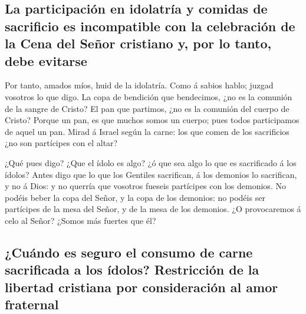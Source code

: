 \hypertarget{la-participaciuxf3n-en-idolatruxeda-y-comidas-de-sacrificio-es-incompatible-con-la-celebraciuxf3n-de-la-cena-del-seuxf1or-cristiano-y-por-lo-tanto-debe-evitarse}{%
\subsection{La participación en idolatría y comidas de sacrificio es
incompatible con la celebración de la Cena del Señor cristiano y, por lo
tanto, debe
evitarse}\label{la-participaciuxf3n-en-idolatruxeda-y-comidas-de-sacrificio-es-incompatible-con-la-celebraciuxf3n-de-la-cena-del-seuxf1or-cristiano-y-por-lo-tanto-debe-evitarse}}

 Por tanto, amados míos, huid de la idolatría.
 Como á sabios hablo; juzgad vosotros lo que digo.
 La copa de bendición que bendecimos, ¿no es la comunión
de la sangre de Cristo? El pan que partimos, ¿no es la comunión del
cuerpo de Cristo?  Porque un pan, es que muchos somos un
cuerpo; pues todos participamos de aquel un pan.  Mirad á
Israel según la carne: los que comen de los sacrificios ¿no son
partícipes con el altar?

 ¿Qué pues digo? ¿Que el ídolo es algo? ¿ó que sea algo
lo que es sacrificado á los ídolos?  Antes digo que lo
que los Gentiles sacrifican, á los demonios lo sacrifican, y no á Dios:
y no querría que vosotros fueseis partícipes con los demonios.
 No podéis beber la copa del Señor, y la copa de los
demonios: no podéis ser partícipes de la mesa del Señor, y de la mesa de
los demonios.  ¿O provocaremos á celo al Señor? ¿Somos
más fuertes que él?

\hypertarget{cuuxe1ndo-es-seguro-el-consumo-de-carne-sacrificada-a-los-uxeddolos-restricciuxf3n-de-la-libertad-cristiana-por-consideraciuxf3n-al-amor-fraternal}{%
\subsection{¿Cuándo es seguro el consumo de carne sacrificada a los
ídolos? Restricción de la libertad cristiana por consideración al amor
fraternal}\label{cuuxe1ndo-es-seguro-el-consumo-de-carne-sacrificada-a-los-uxeddolos-restricciuxf3n-de-la-libertad-cristiana-por-consideraciuxf3n-al-amor-fraternal}}

